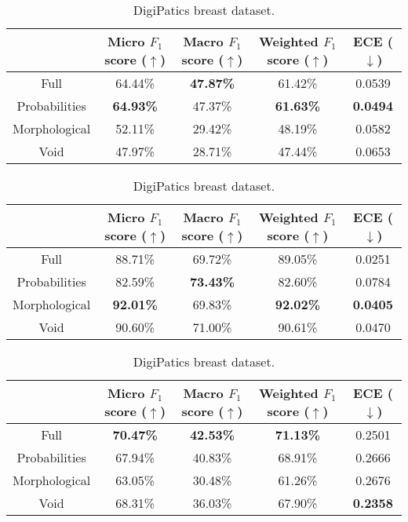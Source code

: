 \begin{table}[ht]
    \centering
    \caption{Result of the Void GNNs experiment.}
    \begin{tabular}{c|c|c|c|c|}
  \cline{2-5}
  & Micro $F_1$ score ($\uparrow$) & Macro $F_1$ score ($\uparrow$) & Weighted $F_1$ score ($\uparrow$) & ECE ($\downarrow$) \\ \hline
\multicolumn{1}{|c|}{Full}  & 64.44\% & \textbf{47.87\%} & 61.42\% & 0.0539  \\ \hline
\multicolumn{1}{|c|}{Probabilities}  & \textbf{64.93\%} & 47.37\% & \textbf{61.63\%} & \textbf{0.0494} \\ \hline
\multicolumn{1}{|c|}{Morphological}  & 52.11\% & 29.42\% & 48.19\% & 0.0582 \\ \hline
\multicolumn{1}{|c|}{Void}  & 47.97\% & 28.71\% & 47.44\% & 0.0653 \\ \hline
\end{tabular}
\caption{CoNSeP dataset.}

\vspace{0.5cm}

\begin{tabular}{c|c|c|c|c|}
  \cline{2-5}
  & Micro $F_1$ score ($\uparrow$) & Macro $F_1$ score ($\uparrow$) & Weighted $F_1$ score ($\uparrow$) & ECE ($\downarrow$) \\ \hline
\multicolumn{1}{|c|}{Full}  & 88.71\% & 69.72\% & 89.05\% & 0.0251  \\ \hline
\multicolumn{1}{|c|}{Probabilities}  & 82.59\% & \textbf{73.43\%} & 82.60\% & 0.0784 \\ \hline
\multicolumn{1}{|c|}{Morphological}  & \textbf{92.01\%} & 69.83\% & \textbf{92.02\%} & \textbf{0.0405} \\ \hline
\multicolumn{1}{|c|}{Void}  & 90.60\% & 71.00\% & 90.61\% & 0.0470 \\ \hline
\end{tabular}
\caption{MoNuSAC dataset.}

\vspace{0.5cm}

\begin{tabular}{c|c|c|c|c|}
  \cline{2-5}
  & Micro $F_1$ score ($\uparrow$) & Macro $F_1$ score ($\uparrow$) & Weighted $F_1$ score ($\uparrow$) & ECE ($\downarrow$) \\ \hline
\multicolumn{1}{|c|}{Full}  & \textbf{70.47\%} & \textbf{42.53\%} & \textbf{71.13\%} & 0.2501  \\ \hline
\multicolumn{1}{|c|}{Probabilities}  & 67.94\% & 40.83\% & 68.91\% & 0.2666 \\ \hline
\multicolumn{1}{|c|}{Morphological}  & 63.05\% & 30.48\% & 61.26\% & 0.2676 \\ \hline
\multicolumn{1}{|c|}{Void}  & 68.31\% & 36.03\% & 67.90\% & \textbf{0.2358} \\ \hline
\end{tabular}
\caption{DigiPatics breast dataset.}


\end{table}
